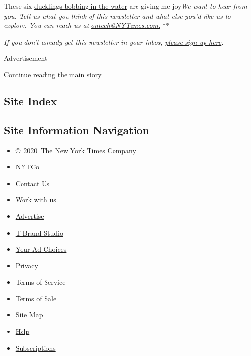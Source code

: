 These six
\href{https://twitter.com/BirdCentralPark/status/1282425858368638977?s=09}{ducklings
bobbing in the water} are giving me joy\emph{We want to hear from you.
Tell us what you think of this newsletter and what else you'd like us to
explore. You can reach us at}
\href{mailto:ontech@NYTimes.com?subject=On\%20Tech\%20Feedback}{\emph{ontech@NYTimes.com.}}
**

\emph{If you don't already get this newsletter in your inbox,}
\href{https://www.nytimes3xbfgragh.onion/newsletters/signup/OT}{\emph{please
sign up here}}\emph{.}

Advertisement

\protect\hyperlink{after-bottom}{Continue reading the main story}

\hypertarget{site-index}{%
\subsection{Site Index}\label{site-index}}

\hypertarget{site-information-navigation}{%
\subsection{Site Information
Navigation}\label{site-information-navigation}}

\begin{itemize}
\tightlist
\item
  \href{https://help.nytimes3xbfgragh.onion/hc/en-us/articles/115014792127-Copyright-notice}{©~2020~The
  New York Times Company}
\end{itemize}

\begin{itemize}
\tightlist
\item
  \href{https://www.nytco.com/}{NYTCo}
\item
  \href{https://help.nytimes3xbfgragh.onion/hc/en-us/articles/115015385887-Contact-Us}{Contact
  Us}
\item
  \href{https://www.nytco.com/careers/}{Work with us}
\item
  \href{https://nytmediakit.com/}{Advertise}
\item
  \href{http://www.tbrandstudio.com/}{T Brand Studio}
\item
  \href{https://www.nytimes3xbfgragh.onion/privacy/cookie-policy\#how-do-i-manage-trackers}{Your
  Ad Choices}
\item
  \href{https://www.nytimes3xbfgragh.onion/privacy}{Privacy}
\item
  \href{https://help.nytimes3xbfgragh.onion/hc/en-us/articles/115014893428-Terms-of-service}{Terms
  of Service}
\item
  \href{https://help.nytimes3xbfgragh.onion/hc/en-us/articles/115014893968-Terms-of-sale}{Terms
  of Sale}
\item
  \href{https://spiderbites.nytimes3xbfgragh.onion}{Site Map}
\item
  \href{https://help.nytimes3xbfgragh.onion/hc/en-us}{Help}
\item
  \href{https://www.nytimes3xbfgragh.onion/subscription?campaignId=37WXW}{Subscriptions}
\end{itemize}
